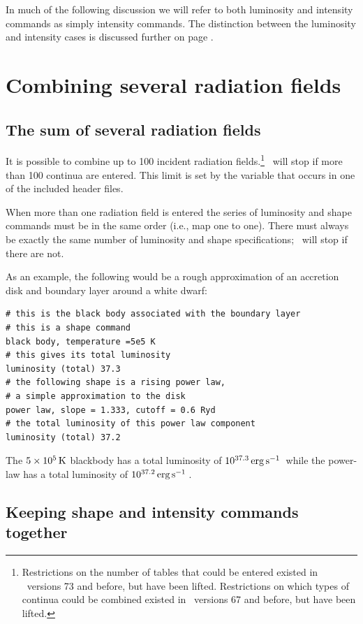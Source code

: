 In much of the following discussion we will refer to both
luminosity and intensity commands as simply intensity commands.
The distinction between the luminosity and intensity cases
is discussed further on page \pageref{sec:IntensityLuminosityCases}.

\section{Combining several radiation fields}

\subsection{The sum of several radiation fields}

It is possible to combine up to 100 incident radiation fields.\footnote{
Restrictions on the number of tables that could be entered existed
in \Cloudy\ versions 73 and before, but have been lifted. Restrictions on
which types of continua could be combined existed in \Cloudy\ versions 67
and before, but have been lifted.}   \Cloudy\ will stop if
more than 100 continua are entered.
This limit is set by the variable 
that occurs in one of the included header files.

When more than one radiation field is entered the series of luminosity and
shape commands must be in the same order (i.e., map one to one).  There
must always be exactly the same number of luminosity and shape
specifications; \Cloudy\ will stop if there are not.

As an example, the following would be a rough approximation of an
accretion disk and boundary layer around a white dwarf:
\begin{verbatim}
# this is the black body associated with the boundary layer
# this is a shape command
black body, temperature =5e5 K
# this gives its total luminosity 
luminosity (total) 37.3
# the following shape is a rising power law, 
# a simple approximation to the disk 
power law, slope = 1.333, cutoff = 0.6 Ryd
# the total luminosity of this power law component
luminosity (total) 37.2
\end{verbatim}
The $5\times 10^5 {\rm\thinspace K}$ blackbody has a total luminosity of
$10^{37.3} \mbox{${\rm\thinspace erg}{\rm\thinspace s}^{-1}\,$}$ while
the power-law has a total luminosity of
$10^{37.2} \mbox{${\rm\thinspace erg}{\rm\thinspace s}^{-1}\,$} $.

\subsection{Keeping shape and intensity commands together}

